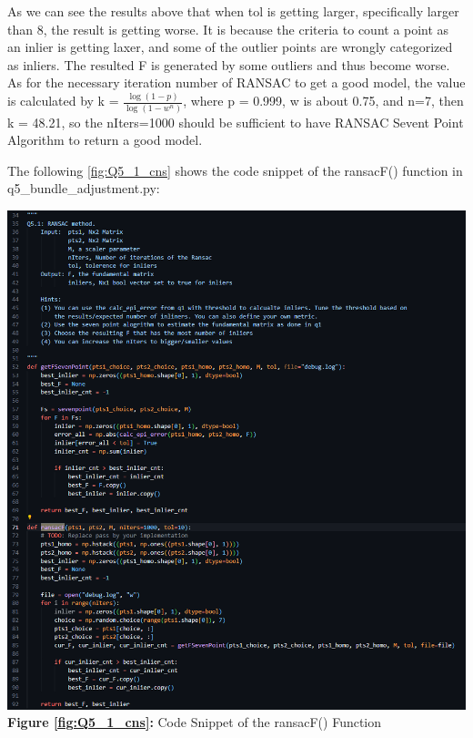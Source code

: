 \begin{your_solution}[title=Q5.1 continued, height=22.5cm,width=\linewidth]
As we can see the results above that when tol is getting larger, specifically larger than 8, the result is getting worse. It is because the criteria to count a point as an inlier is getting laxer, and some of the outlier points are wrongly categorized as inliers. The resulted F is generated by some outliers and thus become worse. As for the necessary iteration number of RANSAC to get a good model, the value is calculated by k = $\frac{\log(1-p)}{\log(1-w^n)}$, where p = 0.999, w is about 0.75, and n=7, then k = 48.21, so the nIters=1000 should be sufficient to have RANSAC Sevent Point Algorithm to return a good model.
\newline

The following \autoref{fig:Q5_1_cns} shows the code snippet of the ransacF() function in q5\_bundle\_adjustment.py:	
\newline


\begin{minipage}{1\linewidth}
	\centering
	\includegraphics[width=1\linewidth, height=1\columnwidth]{../Q5_1_cns.png}
	\textbf{Figure \ref{fig:Q5_1_cns}:} Code Snippet of the ransacF() Function  %
	\label{fig:Q5_1_cns}         %
\end{minipage}
\end{your_solution}

